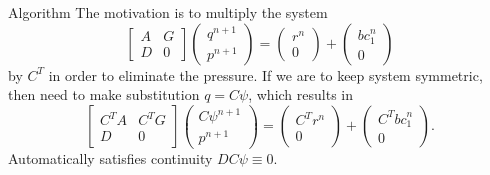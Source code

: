 \documentclass{beamer}
\begin{document}
	
	
	\begin{frame}{Algorithm}
		The motivation is to multiply the system 
		\begin{equation}\label{eqn:NSE-dsm-bl-system-nonint}
		{\begin{bmatrix}
			{A} & {G} \\
			{D} & 0
		\end{bmatrix}
		\begin{pmatrix}
			q^{n+1} \\ 
			p^{n+1}
		\end{pmatrix}
		=
		\begin{pmatrix}
			{r}^n \\
			0
		\end{pmatrix}
		+
		\begin{pmatrix}
			{bc}_1^n\\
			0
		\end{pmatrix}}
		\end{equation}
	by $C^T$ in order to eliminate the pressure. If we are to keep system symmetric, then need to make substitution $q=C\psi$, which results in  
		\begin{equation}\label{eqn:NSE-dsm-bl-system-nonint}
		{\begin{bmatrix}
			{C^TA} & {C^TG} \\
			{D} & 0
		\end{bmatrix}
		\begin{pmatrix}
			C\psi^{n+1} \\ 
			p^{n+1}
		\end{pmatrix}
		=
		\begin{pmatrix}
			C^T{r}^n \\
			0
		\end{pmatrix}
		+
		\begin{pmatrix}
			C^T{bc}_1^n\\
			0
		\end{pmatrix}}.
		\end{equation}
		Automatically satisfies continuity $DC\psi\equiv 0$.
		
	\end{frame}
	
\end{document}
